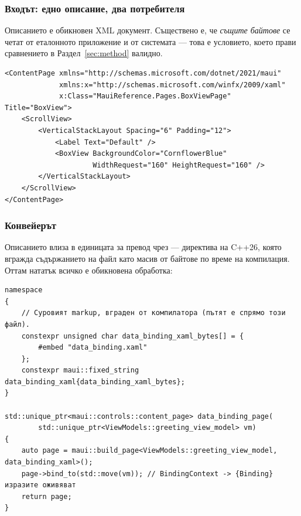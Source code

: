 \subsubsection{Входът: едно описание, два потребителя}

Описанието е обикновен XML документ. Съществено е, че \emph{същите байтове} се четат от
еталонното приложение и от системата --- това е условието, което прави сравнението в
Раздел~\ref{sec:method} валидно.

\begin{lstlisting}[caption={Откъс от описание на интерфейс},label={lst:xaml_src},
  basicstyle=\scriptsize\ttfamily]
<ContentPage xmlns="http://schemas.microsoft.com/dotnet/2021/maui"
             xmlns:x="http://schemas.microsoft.com/winfx/2009/xaml"
             x:Class="MauiReference.Pages.BoxViewPage" Title="BoxView">
    <ScrollView>
        <VerticalStackLayout Spacing="6" Padding="12">
            <Label Text="Default" />
            <BoxView BackgroundColor="CornflowerBlue"
                     WidthRequest="160" HeightRequest="160" />
        </VerticalStackLayout>
    </ScrollView>
</ContentPage>
\end{lstlisting}

\subsubsection{Конвейерът}

Описанието влиза в единицата за превод чрез  --- директива на C++26, която
вгражда съдържанието на файл като масив от байтове по време на компилация. Оттам нататък
всичко е обикновена  обработка:

\begin{lstlisting}[caption={Вграждане и изграждане на страница по време на компилация},
  label={lst:xaml_build}, basicstyle=\scriptsize\ttfamily]
namespace
{
    // Суровият markup, вграден от компилатора (пътят е спрямо този файл).
    constexpr unsigned char data_binding_xaml_bytes[] = {
        #embed "data_binding.xaml"
    };
    constexpr maui::fixed_string data_binding_xaml{data_binding_xaml_bytes};
}

std::unique_ptr<maui::controls::content_page> data_binding_page(
        std::unique_ptr<ViewModels::greeting_view_model> vm)
{
    auto page = maui::build_page<ViewModels::greeting_view_model, data_binding_xaml>();
    page->bind_to(std::move(vm)); // BindingContext -> {Binding} изразите оживяват
    return page;
}
\end{lstlisting}

